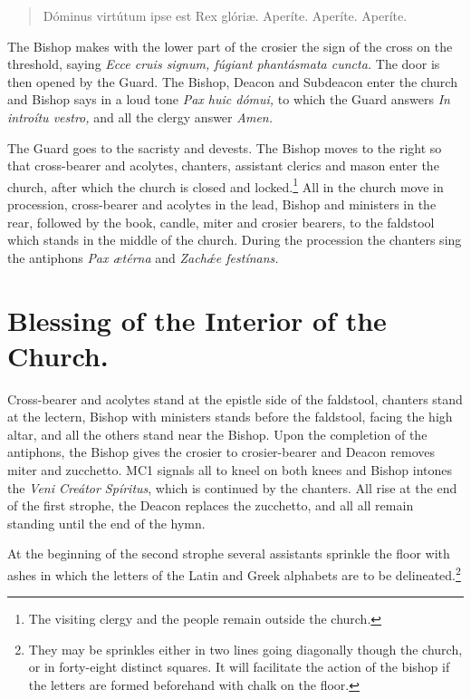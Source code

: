 \documentclass[letterpaper]{report}
\begin{document}
{    \begin{quote}
        Dóminus virtútum ipse est Rex glóri\ae. Aperíte. Aperíte. Aperíte.
    \end{quote}

    \rubric The Bishop makes with the lower part of the crosier the sign of the
    cross on the threshold, saying \textit{Ecce cru\cross is signum, f\'ugiant
    phant\'asmata cuncta.} The door is then opened by the Guard. The Bishop,
    Deacon and Subdeacon enter the church and Bishop says in a loud tone
    \textit{Pax huic d\'omui,} to which the Guard answers \textit{In introítu
    vestro,} and all the clergy answer \textit{Amen.}

    \rubric The Guard goes to the sacristy and devests. The Bishop moves to the
    right so that cross-bearer and acolytes, chanters, assistant clerics and
    mason enter the church, after which the church is closed and
    locked.\footnote{The visiting clergy and the people remain outside the
    church.} All in the church move in procession, cross-bearer and acolytes in
    the lead, Bishop and ministers in the rear, followed by the book, candle,
    miter and crosier bearers, to the faldstool which stands in the middle of
    the church. During the procession the chanters sing the antiphons
    \textit{Pax \ae t\'erna} and \textit{Zach\'\ae e fest\'inans.}

    \section{Blessing of the Interior of the Church.}

    \rubric Cross-bearer and acolytes stand at the epistle side of the
    faldstool, chanters stand at the lectern, Bishop with ministers stands
    before the faldstool, facing the high altar, and all the others stand near
    the Bishop. Upon the completion of the antiphons, the Bishop gives the
    crosier to crosier-bearer and Deacon removes miter and zucchetto. MC1
    signals all to kneel on both knees and Bishop intones the \textit{Veni
    Cre\'ator Sp\'iritus}, which is continued by the chanters. All rise at the
    end of the first strophe, the Deacon replaces the zucchetto, and all all
    remain standing until the end of the hymn.

    \rubric At the beginning of the second strophe several assistants sprinkle
    the floor with ashes in which the letters of the Latin and Greek alphabets
    are to be delineated.\footnote{They may be sprinkles either in two lines
    going diagonally though the church, or in forty-eight distinct squares. It
    will facilitate the action of the bishop if the letters are formed
    beforehand with chalk on the floor.}

}
\end{document}
